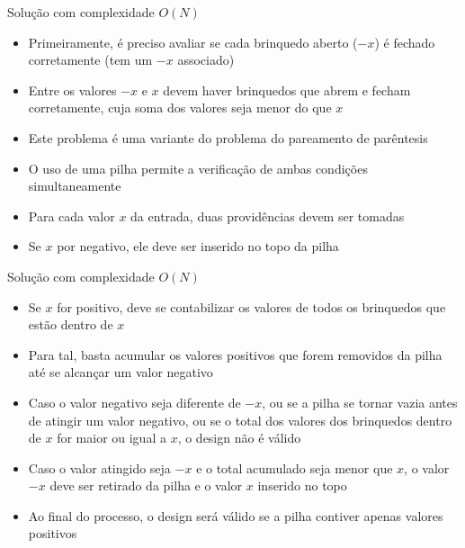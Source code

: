 \begin{frame}[fragile]{Solução com complexidade $O(N)$}

    \begin{itemize}
        \item Primeiramente, é preciso avaliar se cada brinquedo aberto ($-x$) é fechado
            corretamente (tem um $-x$ associado)

        \item Entre os valores $-x$ e $x$ devem haver brinquedos que abrem e fecham corretamente,
            cuja soma dos valores seja menor do que $x$

        \item Este problema é uma variante do problema do pareamento de parêntesis

        \item O uso de uma pilha permite a verificação de ambas condições simultaneamente

        \item Para cada valor $x$ da entrada, duas providências devem ser tomadas

        \item Se $x$ por negativo, ele deve ser inserido no topo da pilha
   \end{itemize}

\end{frame}

\begin{frame}[fragile]{Solução com complexidade $O(N)$}

    \begin{itemize}
        \item Se $x$ for positivo, deve se contabilizar os valores de todos os brinquedos que
            estão dentro de $x$

        \item Para tal, basta acumular os valores positivos que forem removidos da pilha até
            se alcançar um valor negativo

        \item Caso o valor negativo seja diferente de $-x$, ou se a pilha se tornar vazia antes
            de atingir um valor negativo, ou se o total dos valores dos brinquedos dentro de $x$
            for maior ou igual a $x$, o design não é válido

        \item Caso o valor atingido seja $-x$ e o total acumulado seja menor que $x$, o valor
            $-x$ deve ser retirado da pilha e o valor $x$ inserido no topo

        \item Ao final do processo, o design será válido se a pilha contiver apenas valores
            positivos
    \end{itemize}

\end{frame}


